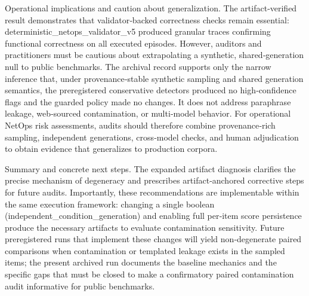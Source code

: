 \documentclass[conference]{IEEEtran}
\begin{document}
Operational implications and caution about generalization. The artifact‑verified result demonstrates that validator‑backed correctness checks remain essential: deterministic\_netops\_validator\_v5 produced granular traces confirming functional correctness on all executed episodes. However, auditors and practitioners must be cautious about extrapolating a synthetic, shared‑generation null to public benchmarks. The archival record supports only the narrow inference that, under provenance‑stable synthetic sampling and shared generation semantics, the preregistered conservative detectors produced no high‑confidence flags and the guarded policy made no changes. It does not address paraphrase leakage, web‑sourced contamination, or multi‑model behavior. For operational NetOps risk assessments, audits should therefore combine provenance‑rich sampling, independent generations, cross‑model checks, and human adjudication to obtain evidence that generalizes to production corpora.

Summary and concrete next steps. The expanded artifact diagnosis clarifies the precise mechanism of degeneracy and prescribes artifact‑anchored corrective steps for future audits. Importantly, these recommendations are implementable within the same execution framework: changing a single boolean (independent\_condition\_generation) and enabling full per‑item score persistence produce the necessary artifacts to evaluate contamination sensitivity. Future preregistered runs that implement these changes will yield non‑degenerate paired comparisons when contamination or templated leakage exists in the sampled items; the present archived run documents the baseline mechanics and the specific gaps that must be closed to make a confirmatory paired contamination audit informative for public benchmarks.
\end{document}
